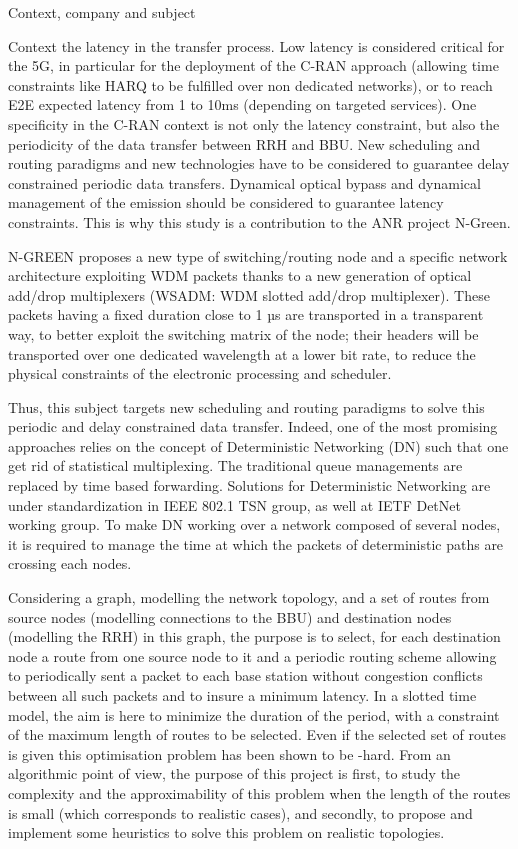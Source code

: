 \documentclass[a4paper,10pt]{report}
\begin{document}
\begin{chapter}{Context, company and subject}
\begin{section}{Context}
the latency in the transfer process.  Low latency is considered critical for the 5G, in particular for the deployment of the C-RAN approach 
(allowing time constraints like HARQ to be fulfilled over non dedicated networks), or to reach E2E expected latency from 1 to 10ms 
(depending on targeted services). One specificity in the C-RAN context is not only the latency constraint, but also the periodicity of 
the data transfer between RRH and BBU.  New scheduling and routing paradigms and new technologies have to be considered to  guarantee 
delay constrained periodic data transfers. Dynamical optical bypass and dynamical management of the emission should be considered to
guarantee latency constraints. This is why this study is a contribution to the ANR project N-Green.

N-GREEN proposes a new type of switching/routing node and a specific network architecture exploiting WDM packets thanks to a new generation of optical add/drop multiplexers (WSADM: WDM slotted add/drop multiplexer). These packets having a fixed duration close to 1 µs are transported in a transparent way, to better exploit the switching matrix of the node; their headers will be transported over one dedicated wavelength at a lower bit rate, to reduce the physical constraints of the electronic processing and scheduler.

 Thus, this subject targets new scheduling and routing paradigms to solve this periodic and delay constrained data transfer.
 Indeed, one of the most promising approaches relies on the concept of Deterministic Networking (DN) such that one get rid of
 statistical multiplexing. The traditional queue managements are replaced by time based forwarding. Solutions for Deterministic 
 Networking are under standardization in IEEE 802.1 TSN group, as well at IETF DetNet working group.  To make DN working over a
 network composed of several nodes, it is required to manage the time at which the packets of deterministic paths are crossing each nodes. 

Considering a graph, modelling the network topology, and a set of routes from source nodes (modelling connections to the BBU) and destination 
nodes (modelling the RRH) in this graph, the purpose is to select, for each destination node a route from one source node to it and a periodic 
routing scheme allowing to periodically sent a packet to each base station without congestion conflicts between all such packets and to insure a minimum latency. In a slotted time model, the aim is here to minimize the duration of the period, with a constraint of the maximum length of routes to be
selected. Even if the selected set of routes is given this optimisation problem has been shown to be  \NP-hard. From an algorithmic point of view,
the purpose of this project is first, to study the complexity and the approximability of this problem when the length of the routes is small
(which corresponds to realistic cases), and secondly, to propose and implement some heuristics to solve this problem on realistic topologies.



\end{section}
\end{chapter}
\end{document}
